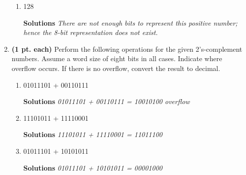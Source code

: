 \begin{enumerate}
\begin{enumerate}
                    \item  128

                        \begin{onlysolution} \textbf{Solutions} \itshape{
                                There are not enough bits to represent this positive number; hence
                                the 8-bit representation does not exist.
                            }
                        \end{onlysolution}

                \end{enumerate}

            \item \textbf{ (1 pt. each)} Perform the following operations for the given
                2's-complement numbers. Assume a word size of eight bits
                in all cases. Indicate where overflow occurs. If there is no overflow,
                convert the result to decimal.
                \begin{enumerate}

                    \item 01011101 + 00110111

                        \begin{onlysolution} \textbf{Solutions} \itshape{
                                01011101 + 00110111 = 10010100  overflow
                            }
                        \end{onlysolution}

                    \item 11101011 + 11110001

                        \begin{onlysolution} \textbf{Solutions} \itshape{
                                11101011 +
                                11110001 =
                                11011100
                            }
                        \end{onlysolution}

                    \item 01011101 + 10101011

                        \begin{onlysolution} \textbf{Solutions} \itshape{
                                01011101 +
                                10101011 =
                                00001000
                            }
                        \end{onlysolution}


\end{enumerate}
\end{enumerate}
